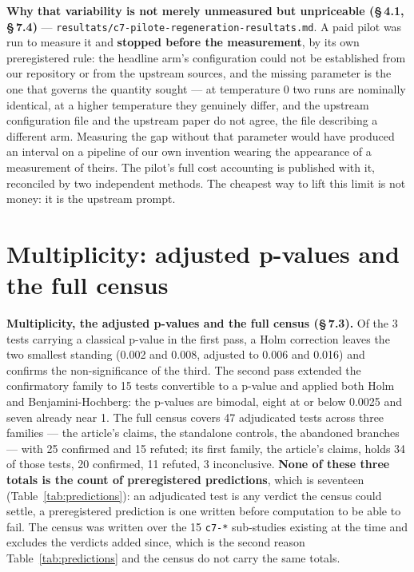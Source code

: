 \documentclass[sigconf,anonymous,review]{acmart}
\begin{document}
\textbf{Why that variability is not merely unmeasured but unpriceable (\S\,4.1, \S\,7.4)} --- \texttt{resultats/\allowbreak{}c7-\allowbreak{}pilote-\allowbreak{}regeneration-\allowbreak{}resultats\allowbreak{}.md}. A paid pilot was run to measure it and \textbf{stopped before the measurement}, by its own preregistered rule: the headline arm's configuration could not be established from our repository or from the upstream sources, and the missing parameter is the one that governs the quantity sought --- at temperature 0 two runs are nominally identical, at a higher temperature they genuinely differ, and the upstream configuration file and the upstream paper do not agree, the file describing a different arm. Measuring the gap without that parameter would have produced an interval on a pipeline of our own invention wearing the appearance of a measurement of theirs. The pilot's full cost accounting is published with it, reconciled by two independent methods. The cheapest way to lift this limit is not money: it is the upstream prompt.

\section{Multiplicity: adjusted p-values and the full census}

\textbf{Multiplicity, the adjusted p-values and the full census (\S\,7.3).} Of the 3 tests carrying a classical p-value in the first pass, a Holm correction leaves the two smallest standing (0.002 and 0.008, adjusted to 0.006 and 0.016) and confirms the non-significance of the third. The second pass extended the confirmatory family to 15 tests convertible to a p-value and applied both Holm and Benjamini-Hochberg: the p-values are bimodal, eight at or below 0.0025 and seven already near 1. The full census covers 47 adjudicated tests across three families --- the article's claims, the standalone controls, the abandoned branches --- with 25 confirmed and 15 refuted; its first family, the article's claims, holds 34 of those tests, 20 confirmed, 11 refuted, 3 inconclusive. \textbf{None of these three totals is the count of preregistered predictions}, which is seventeen (Table~\ref{tab:predictions}): an adjudicated test is any verdict the census could settle, a preregistered prediction is one written before computation to be able to fail. The census was written over the 15 \texttt{c7-\allowbreak{}*} sub-studies existing at the time and excludes the verdicts added since, which is the second reason Table~\ref{tab:predictions} and the census do not carry the same totals.
\end{document}
